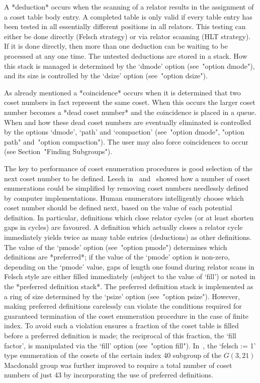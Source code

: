 A *deduction* occurs when the scanning of  a  relator
results in the assignment of a coset table  body  entry.  A  completed
table is only valid if every  table  entry  has  been  tested  in  all
essentially different positions in  all  relators.  This  testing  can
either be done directly (Felsch strategy) or via relator scanning (HLT
strategy). If it is done directly, then more than one deduction can be
waiting to be processed at any one time. The untested  deductions  are
stored in a stack. How this stack is  managed  is  determined  by  the
`dmode' option (see~"option dmode"), and its size is controlled by the
`dsize' option (see~"option dsize").

As already mentioned a *coincidence* occurs when it
is determined that two coset numbers in fact represent the same coset.
When this occurs  the  larger  coset  number  becomes  a  *dead  coset
number* and the coincidence is placed in  a
queue. When and how these dead coset numbers are eventually eliminated
is  controlled  by  the  options  `dmode',  `path'  and   `compaction'
(see~"option dmode", "option path" and~"option compaction"). The  user
may  also  force   coincidences   to   occur   (see   Section~"Finding
Subgroups").

The key  to  performance  of  coset  enumeration  procedures  is  good
selection  of  the  next   coset   number   to   be   defined.   Leech
in~\cite{Lee77}  and~\cite{Lee84}  showed  how  a  number   of   coset
enumerations could be simplified by removing coset numbers  needlessly
defined by computer implementations. Human  enumerators  intelligently
choose which coset number should be defined next, based on  the  value
of each potential definition. In particular, definitions  which  close
relator cycles (or at least shorten gaps in cycles)  are  favoured.  A
definition which actually closes a relator  cycle  immediately  yields
twice as many table entries (deductions)  as  other  definitions.  The
value of the `pmode'  option  (see~"option  pmode")  determines  which
definitions are *preferred*; if the value of  the  `pmode'  option  is
non-zero, depending on the `pmode' value, gaps  of  length  one  found
during relator scans in Felsch style  are  either  filled  immediately
(subject to the value of `fill') or noted in the *preferred definition
stack*.  The  preferred  definition
stack is implemented as a ring  of  size  determined  by  the  `psize'
option (see~"option psize").  However,  making  preferred  definitions
carelessly  can  violate  the  conditions  required   for   guaranteed
termination of the coset enumeration procedure in the case  of  finite
index. To avoid such a violation {\ACE}  ensures  a  fraction  of  the
coset table is filled before  a  preferred  definition  is  made;  the
reciprocal of this fraction, the `fill factor', is manipulated via the
`fill' option (see~"option fill"). In~\cite{Hav91}, the `felsch :=  1'
type enumeration of the cosets of the certain index 40 subgroup of the
$G(3,21)$ Macdonald group was further  improved  to  require  a  total
number of coset numbers  of  just  43  by  incorporating  the  use  of
preferred definitions.

